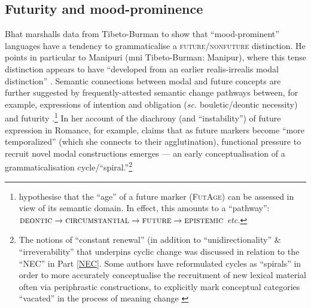 \subsection{Futurity and mood-prominence}
Bhat marshalls data from Tibeto-Burman to show that ``mood-prominent'' languages have a tendency to grammaticalise a \textsc{future/nonfuture} distinction. He points in particular to Manipuri (\gls{mni} Tibeto-Burman: Manipur), where this tense distinction appears to have ``developed from an earlier realis-irrealis modal distinction'' \citeyearpar[19]{Bhat1999}. Semantic connections between modal and future concepts are further suggested by frequently-attested semantic change pathways between, for example, expressions of intention and obligation (\textit{sc.} bouletic/deontic necessity) and futurity \citep[and then to epistemic modality, \textit{e.g.},][]{Bybee1978,Bybee1991,Bybee1994,Kuteva2019}.\footnote{\citet*{Bybee1991} hypothesise that the ``age'' of a future marker (\textsc{FutAge}) can be assessed in view of its semantic domain. In effect, this amounts to a ``pathway'': $\textsc{deontic}\to\textsc{circumstantial}\to\textsc{future}\to\textsc{epistemic}$ \textit{etc.}} In her account of the diachrony (and ``instability'') of future expression in Romance, for example, \citet[31, 75, 106]{Fleischman1982} claims that as future markers become ``more temporalized'' (which she connects to their agglutination), functional pressure to recruit novel modal constructions emerges --- an early conceptualisation of a grammaticalisation cycle/``spiral.''\footnote{The notions of ``constant renewal'' (in addition to ``unidirectionality'' \& ``irreverability'' that underpins cyclic change was discussed in relation to the ``\acrlong{NEC}'' in Part \ref{NEC}. Some authors have reformulated cycles as ``spirals'' in order to more accurately conceptualise the recruitment of new lexical material often via periphrastic constructions, to explicitly mark conceptual categories ``vacated'' in the process of meaning change \citetext{\citealp{Haspelmath2000} attributes this metaphor to \citealt{VonGabalentz1901}.}}


